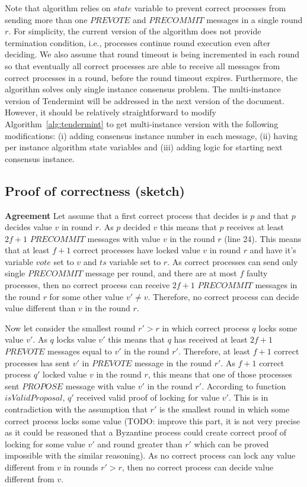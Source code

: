 Note that algorithm relies on $state$ variable to prevent correct processes from sending more than one $PREVOTE$ and $PRECOMMIT$ messages in a single round $r$. For simplicity, the current version of the algorithm does not provide termination condition, i.e., processes continue round execution even after deciding. We also assume that round timeout is being incremented in each round so that eventually all correct processes are able to receive all messages from correct processes in a round, before the round timeout expires.  
Furthermore, the algorithm solves only single instance consensus problem. The multi-instance version of Tendermint will be addressed in the next version of the document. However, it should be relatively straightforward to modify Algorithm~\ref{alg:tendermint} to get multi-instance version with the following modifications: (i) adding consensus instance number in each message, (ii) having per instance algorithm state variables and (iii) adding logic for starting next consensus instance.

\subsection{Proof of correctness (sketch)}

\textbf{Agreement} Let assume that a first correct process that decides is $p$ and that $p$ decides value $v$ in round $r$. As $p$ decided $v$ this means that $p$ receives at least $2f+1$ $PRECOMMIT$ messages with value $v$ in the round $r$ (line 24). This means that at least $f+1$ correct processes have locked value $v$ in round $r$ and have it's variable $vote$ set to $v$ and $ts$ variable set to $r$. As correct processes can send only single $PRECOMMIT$ message per round, and there are at most $f$ faulty processes, then no correct process can receive $2f+1$ $PRECOMMIT$ messages in the round $r$ for some other value $v' \neq v$. Therefore, no correct process can decide value different than $v$ in the round $r$. 

Now let consider the smallest round $r' > r$ in which correct process $q$ locks some value $v'$. As $q$ locks value $v'$ this means that $q$ has received at least $2f+1$ $PREVOTE$ messages equal to $v'$ in the round $r'$. Therefore, at least $f+1$ correct processes has sent $v'$ in $PREVOTE$ message in the round $r'$. As $f+1$ correct process $q'$ locked value $v$ in the round $r$, this means that one of those processes sent $PROPOSE$ message with value $v'$ in the round $r'$. According to function $isValidProposal$, $q'$ received valid proof of locking for value $v'$. This is in contradiction with the assumption that $r'$ is the smallest round in which some correct process locks some value (TODO: improve this part, it is not very precise as it could be reasoned that a Byzantine process could create correct proof of locking for some value $v'$ and round greater than $r'$ which can be proved impossible with the similar reasoning). As no correct process can lock any value different from $v$ in rounds $r' > r$, then no correct process can decide value different from $v$. 

